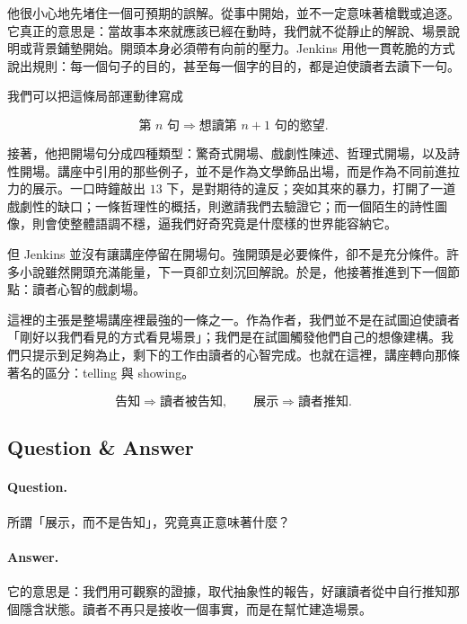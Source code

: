 他很小心地先堵住一個可預期的誤解。從事中開始，並不一定意味著槍戰或追逐。它真正的意思是：當故事本來就應該已經在動時，我們就不從靜止的解說、場景說明或背景鋪墊開始。開頭本身必須帶有向前的壓力。Jenkins 用他一貫乾脆的方式說出規則：每一個句子的目的，甚至每一個字的目的，都是迫使讀者去讀下一句。

我們可以把這條局部運動律寫成

\begin{equation}
\text{第 } n \text{ 句} \Rightarrow \text{想讀第 } n+1 \text{ 句的慾望}.
\end{equation}

接著，他把開場句分成四種類型：驚奇式開場、戲劇性陳述、哲理式開場，以及詩性開場。講座中引用的那些例子，並不是作為文學飾品出場，而是作為不同前進拉力的展示。一口時鐘敲出 \(13\) 下，是對期待的違反；突如其來的暴力，打開了一道戲劇性的缺口；一條哲理性的概括，則邀請我們去驗證它；而一個陌生的詩性圖像，則會使整體語調不穩，逼我們好奇究竟是什麼樣的世界能容納它。

但 Jenkins 並沒有讓講座停留在開場句。強開頭是必要條件，卻不是充分條件。許多小說雖然開頭充滿能量，下一頁卻立刻沉回解說。於是，他接著推進到下一個節點：讀者心智的戲劇場。

這裡的主張是整場講座裡最強的一條之一。作為作者，我們並不是在試圖迫使讀者「剛好以我們看見的方式看見場景」；我們是在試圖觸發他們自己的想像建構。我們只提示到足夠為止，剩下的工作由讀者的心智完成。也就在這裡，講座轉向那條著名的區分：telling 與 showing。

\begin{equation}
\text{告知} \Rightarrow \text{讀者被告知},\qquad
\text{展示} \Rightarrow \text{讀者推知}.
\end{equation}

\subsection{Question \& Answer}

\paragraph{Question.} 所謂「展示，而不是告知」，究竟真正意味著什麼？

\paragraph{Answer.} 它的意思是：我們用可觀察的證據，取代抽象性的報告，好讓讀者從中自行推知那個隱含狀態。讀者不再只是接收一個事實，而是在幫忙建造場景。

